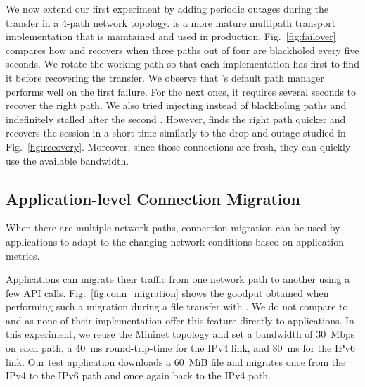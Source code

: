 We now extend our first experiment by adding periodic outages during the
transfer in a 4-path network topology.
\mptcp is a more mature multipath transport implementation that is maintained
and used in production. Fig.~\ref{fig:failover} compares how \mptcp and \tcpls recovers when three paths out of four are blackholed every five seconds. We rotate the working path so that each implementation has first to find it before recovering the transfer. We observe that \mptcp's default path manager performs well on the first failure. For the next ones, it requires several seconds to recover the right path.
We also tried injecting \tcp \rst instead of blackholing paths and \mptcp
indefinitely stalled after the second \rst. However, \tcpls finds the right path quicker and recovers the session in a short time similarly to the drop and \rst outage studied in Fig.~\ref{fig:recovery}. Moreover, since those connections are fresh, they can quickly use the available bandwidth.

\subsection{Application-level Connection Migration}
\label{sec:app-migration}

When there are multiple network paths, connection migration can be used by
applications to adapt to the changing network conditions based on application
metrics.

Applications can migrate their traffic from one network path to another using a few \tcpls API calls. Fig.~\ref{fig:conn_migration} shows the goodput obtained when performing such a migration during a file transfer with \tcpls. We do not compare \tcpls to \mptcp and \quic as none of their implementation offer this feature directly to applications. %
In this experiment, we reuse the Mininet topology %
and set a bandwidth of 30~Mbps on each path, a 40~ms round-trip-time for the IPv4 link, and 80~ms for the IPv6 link. Our test application downloads a 60~MiB file and migrates once from the IPv4 to the IPv6 path and once again back to the IPv4 path.

